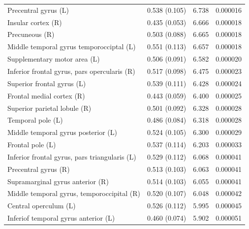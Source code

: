 \documentclass[jou,12pt,a4paper]{apa6}
\begin{document}
\begin{table}[ht]
\begin{threeparttable}
\begin{tabular*}{1\textwidth}{l @{\extracolsep{\fill}} lll}
Precentral gyrus (L)            & 0.538 (0.105)               & 6.738            & 0.000016         \\
Insular cortex (R)             & 0.435 (0.053)               & 6.666            & 0.000018         \\
Precuneous (R)                & 0.503 (0.088)               & 6.665            & 0.000018         \\
Middle temporal gyrus temporocciptal (L)               & 0.551 (0.113)               & 6.657            & 0.000018         \\
Supplementary motor area (L)                        & 0.506 (0.091)               & 6.582            & 0.000020         \\
Inferior frontal gyrus, pars opercularis (R)      & 0.517 (0.098)               & 6.475            & 0.000023         \\
Superior frontal gyrus (L)                        & 0.539 (0.111)               & 6.428            & 0.000024         \\
Frontal medial cortex (R)       & 0.443 (0.059)               & 6.400            & 0.000025         \\
Superior parietal lobule (R)    & 0.501 (0.092)               & 6.328            & 0.000028         \\
Temporal pole (L)               & 0.486 (0.084)               & 6.318            & 0.000028         \\
Middle temporal gyrus posterior (L)                  & 0.524 (0.105)               & 6.300            & 0.000029         \\
Frontal pole (L)                & 0.537 (0.114)               & 6.203            & 0.000033         \\
Inferior frontal gyrus, pars triangularis (L)      & 0.529 (0.112)               & 6.068            & 0.000041         \\
Precentral gyrus (R)          & 0.513 (0.103)               & 6.063            & 0.000041         \\
Supramarginal gyrus anterior (R)   & 0.514 (0.103)               & 6.055            & 0.000041         \\
Middle temporal gyrus, temporoccipital (R)              & 0.520 (0.107)               & 6.048            & 0.000042         \\
Central operculum (L)           & 0.526 (0.112)               & 5.995            & 0.000045         \\
Inferiof temporal gyrus anterior (L)                   & 0.460 (0.074)               & 5.902            & 0.000051         \\

\end{tabular*}
\end{threeparttable}
\end{table}
\end{document}
